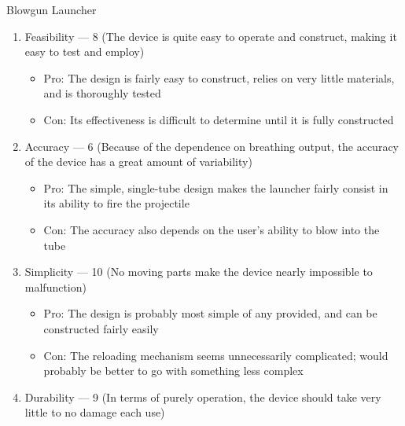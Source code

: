 \begin{center}
  Blowgun Launcher
\end{center}

\begin{enumerate}

  \item Feasibility — 8 (The device is quite easy to operate and construct, making it easy to test and employ)

    \begin{itemize}

      \item Pro: The design is fairly easy to construct, relies on very little materials, and is thoroughly tested

      \item Con: Its effectiveness is difficult to determine until it is fully constructed

    \end{itemize}

  \item Accuracy — 6 (Because of the dependence on breathing output, the accuracy of the device has a great amount of variability)

    \begin{itemize}

      \item Pro: The simple, single-tube design makes the launcher fairly consist in its ability to fire the projectile

      \item Con: The accuracy also depends on the user's ability to blow into the tube

    \end{itemize}

  \item Simplicity — 10 (No moving parts make the device nearly impossible to malfunction)

    \begin{itemize}

      \item Pro: The design is probably most simple of any provided, and can be constructed fairly easily

      \item Con: The reloading mechanism seems unnecessarily complicated; would probably be better to go with something less complex

    \end{itemize}

  \item Durability — 9 (In terms of purely operation, the device should take very little to no damage each use)


\end{enumerate}
